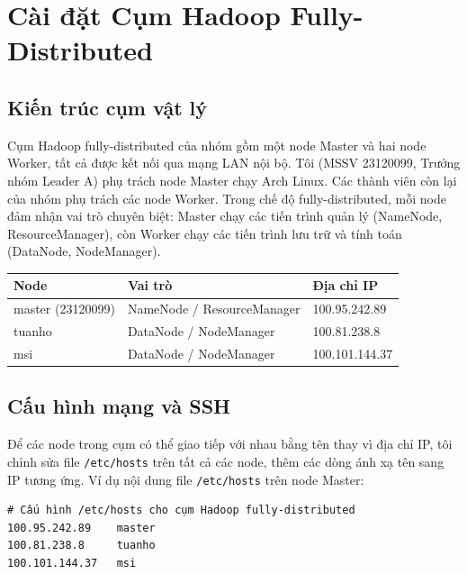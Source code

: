 \section{Cài đặt Cụm Hadoop Fully-Distributed}

\subsection{Kiến trúc cụm vật lý}

Cụm Hadoop fully-distributed của nhóm gồm một node Master và hai node Worker, tất
cả được kết nối qua mạng LAN nội bộ. Tôi (MSSV 23120099, Trưởng nhóm Leader A) phụ
trách node Master chạy Arch Linux. Các thành viên còn lại của nhóm phụ trách các
node Worker. Trong chế độ fully-distributed, mỗi node đảm nhận vai trò chuyên biệt:
Master chạy các tiến trình quản lý (NameNode, ResourceManager), còn Worker chạy các
tiến trình lưu trữ và tính toán (DataNode, NodeManager).

\begin{center}
\begin{tabular}{lll}
\toprule
\textbf{Node} & \textbf{Vai trò} & \textbf{Địa chỉ IP} \\
\midrule
master (23120099) & NameNode / ResourceManager & 100.95.242.89 \\
tuanho            & DataNode / NodeManager     & 100.81.238.8 \\
msi               & DataNode / NodeManager     & 100.101.144.37 \\
\bottomrule
\end{tabular}
\end{center}

\subsection{Cấu hình mạng và SSH}

Để các node trong cụm có thể giao tiếp với nhau bằng tên thay vì địa chỉ IP, tôi
chỉnh sửa file \texttt{/etc/hosts} trên tất cả các node, thêm các dòng ánh xạ tên
sang IP tương ứng. Ví dụ nội dung file \texttt{/etc/hosts} trên node Master:

\begin{verbatim}
# Cấu hình /etc/hosts cho cụm Hadoop fully-distributed
100.95.242.89    master
100.81.238.8     tuanho
100.101.144.37   msi
\end{verbatim}

